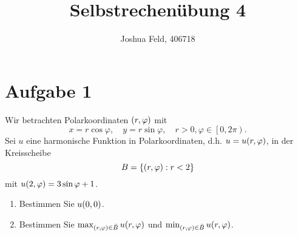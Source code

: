\documentclass{exercise}
\institute{Applied and Computational Mathematics}
\title{Selbstrechenübung 4}
\author{Joshua Feld, 406718}
\begin{document}
    \maketitle


    \section*{Aufgabe 1}

    \begin{problem}
        Wir betrachten Polarkoordinaten \(\parentheses*{r, \varphi}\) mit
        \[
            x = r\cos\varphi, \quad y = r\sin\varphi, \quad r > 0, \varphi \in \left[0, 2\pi\right).
        \]
        Sei \(u\) eine harmonische Funktion in Polarkoordinaten, d.h. \(u = u\parentheses*{r, \varphi}\), in der Kreisscheibe
        \[
            B = \braces*{\parentheses*{r, \varphi} : r < 2}
        \]
        mit \(u\parentheses*{2, \varphi} = 3\sin\varphi + 1\).
        \begin{enumerate}
            \item Bestimmen Sie \(u\parentheses*{0, 0}\).
            \item Bestimmen Sie \(\max_{\parentheses*{r, \varphi} \in \bar{B}}u\parentheses*{r, \varphi}\) und \(\min_{\parentheses*{r, \varphi} \in \bar{B}}u\parentheses*{r, \varphi}\).
        \end{enumerate}
    \end{problem}
\end{document}
